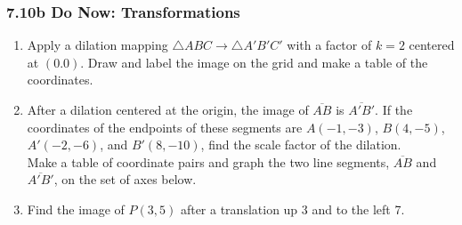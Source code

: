 \documentclass[12pt, twoside]{article}
\begin{document}
\subsubsection*{7.10b Do Now: Transformations}
  \begin{enumerate}
  \item Apply a dilation mapping $\triangle ABC \rightarrow \triangle A'B'C'$ with a factor of $k=2$ centered at $(0.0)$. Draw and label the image on the grid and make a table of the coordinates.
    \begin{flushright} %
    \end{flushright}

  \item After a dilation centered at the origin, the image of $\overline{AB}$ is $\overline{A'B'}$. If the coordinates of the endpoints of these segments are $A(-1,-3)$, $B(4,-5)$, $A'(-2,-6)$, and $B'(8,-10)$, find the scale factor of the dilation.\\[0.25cm]
    Make a table of coordinate pairs and graph the two line segments,  $\overline{AB}$ and  $\overline{A'B'}$, on the set of axes below.
      \begin{flushright}
      \end{flushright}

\newpage
    
  \item Find the image of $P(3,5)$ after a translation up 3 and to the left 7.  \vspace{2cm}


\end{enumerate}
\end{document}

